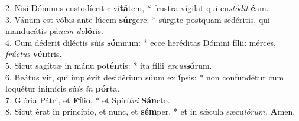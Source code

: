 2. Nisi Dóminus custodíerit civi\textbf{tá}tem, * frustra vígilat qui cu\textit{stódit} \textbf{é}am.\\
3. Vánum est vóbis ante lúcem \textbf{súr}gere: * súrgite postquam sedéritis, qui manducátis pá\textit{nem do}\textbf{ló}ris.\\
4. Cum déderit diléctis súis \textbf{só}mnum: * ecce heréditas Dómini fílii: mérces, \textit{frúctus} \textbf{vén}tris.\\
5. Sicut sagíttæ in mánu po\textbf{tén}tis: * ita fílii \textit{excus}\textbf{só}rum.\\
6. Beátus vir, qui implévit desidérium súum ex \textbf{í}psis: * non confundétur cum loquétur inimícis sú\textit{is in} \textbf{pór}ta.\\
7. Glória Pátri, et \textbf{Fí}lio, * et Spírí\textit{tui} \textbf{Sán}cto.\\
8. Sicut érat in princípio, et nunc, et \textbf{sém}per, * et in sǽcula sæcu\textit{lórum.} \textbf{A}men.